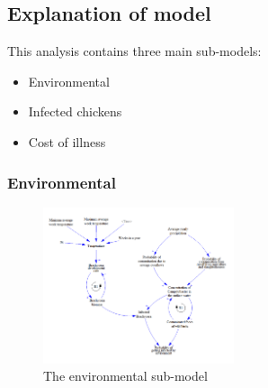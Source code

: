 \subsection{Explanation of model}
   
This analysis contains three main sub-models:

\begin{itemize}
    \item Environmental %
    \item Infected chickens %
    \item Cost of illness %

\end{itemize}

\subsubsection*{Environmental}

\begin{figure}[!ht]
	\centering
	\includegraphics[width=0.5\textwidth]{images/environmental_submodel.png}
	\caption{The environmental sub-model}
	\label{fig:environmental_submodel}
\end{figure}

